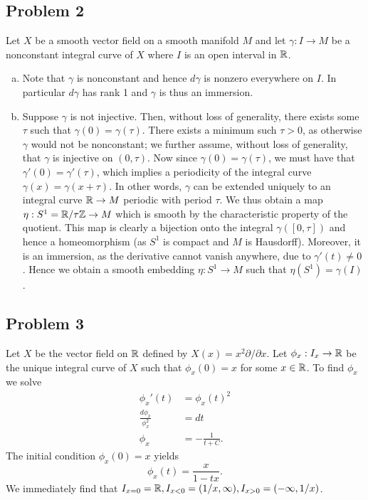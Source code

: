 \documentclass{../mathnotes}
\begin{document}
\subsection*{Problem 2}
Let $X$ be a smooth vector field on a smooth manifold $M$ and let $\gamma:I\to M$ be a nonconstant
integral curve of $X$ where $I$ is an open interval in $\mathbb{R}$.
\begin{enumerate}[(a)]
    \item Note that $\gamma$ is nonconstant and hence $d\gamma$ is nonzero everywhere on $I$.
        In particular $d\gamma$ has rank 1 and $\gamma$ is thus an immersion.
    \item Suppose $\gamma$ is not injective. Then, without loss of generality, there exists some
        $\tau$ such that $\gamma(0)=\gamma(\tau)$. There exists a minimum such $\tau>0$, as
        otherwise $\gamma$ would not be nonconstant; we further assume, without loss of generality,
        that $\gamma$ is injective on $(0,\tau)$. Now since $\gamma(0)=\gamma(\tau)$,
        we must have that $\gamma'(0)=\gamma'(\tau)$, which implies a periodicity of the integral
        curve $\gamma(x)=\gamma(x+\tau)$. In other words, $\gamma$ can be extended uniquely
        to an integral curve $\mathbb{R}\to M$ periodic with period $\tau$. We thus obtain a map
        $\eta:S^1=\mathbb{R}/\tau\mathbb{Z}\to M$ which is smooth by the characteristic property of the quotient.
        This map is clearly a bijection onto the integral $\gamma([0,\tau])$ and hence a
        homeomorphism (as $S^1$ is compact and $M$ is Hausdorff). Moreover, it is an
        immersion, as the derivative cannot vanish anywhere, due to $\gamma'(t)\neq0$.
        Hence we obtain a smooth embedding $\eta:S^1\to M$ such that $\eta(S^1)=\gamma(I)$.
\end{enumerate}


\subsection*{Problem 3}
Let $X$ be the vector field on $\mathbb{R}$ defined by $X(x)=x^2\partial/\partial x$. Let $\phi_x:I_x\to\mathbb{R}$
be the unique integral curve of $X$ such that $\phi_x(0)=x$ for some $x\in\mathbb{R}$. To find $\phi_x$ we
solve
\begin{align*}
    \phi_x'(t) &= \phi_x(t)^2\\
    \frac{d\phi_x}{\phi_x^2} &= dt\\
    \phi_x &= -\frac{1}{t+C}.
\end{align*}
The initial condition $\phi_x(0)=x$ yields
\[\phi_x(t) = \frac{x}{1-tx}.\]
We immediately find that $I_{x=0}=\mathbb{R}, I_{x<0}=(1/x,\infty), I_{x>0}=(-\infty,1/x)$.
\end{document}
